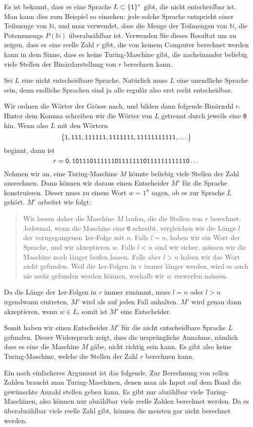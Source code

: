 Es ist bekannt, dass es eine Sprache
$L\subset \{\text{\tt 1}\}^*$ gibt, die nicht entscheidbar ist.
Man kann dies zum Beispiel so einsehen:
jede solche Sprache entspricht einer Teilmenge von $\mathbb N$,
und man verwendet, dass die Menge der Teilmengen von $\mathbb N$,
die Potenzmenge $P(\mathbb N)$ überabzählbar ist.
Verwenden Sie dieses
Resultat um zu zeigen, dass es eine reelle Zahl $r$ gibt, die von keinem
Computer berechnet werden kann in dem Sinne, dass es keine Turing-Maschine
gibt, die nacheinander beliebig viele Stellen der Binärdarstellung von $r$
berechnen
kann.


\begin{loesung}
Sei $L$ eine nicht entscheidbare Sprache. Natürlich muss $L$ eine
unendliche Sprache sein, denn endliche Sprachen sind ja alle regulär
also erst recht entscheidbar.

Wir ordnen die Wörter der Grösse nach, und bilden dann folgende
Binärzahl $r$. Hinter dem Komma schreiben wir die Wörter von $L$
getrennt durch jeweils eine {\tt 0} hin. Wenn also $L$ mit
den Wörtern
\[
\{
\text{\tt 1},
\text{\tt 111},
\text{\tt 111111},
\text{\tt 1111111},
\text{\tt 11111111111},
\dots
\}
\]
beginnt, dann ist
\[
r=\text{\tt 0},\text{\tt 101110111111011111110111111111110}\dots
\]
Nehmen wir an, eine Turing-Maschine $M$ könnte beliebig viele Stellen
der Zahl ausrechnen. Dann können wir daraus einen Entscheider $M'$ für
die Sprache konstruieren. Dieser muss zu einem Wort $w=1^n$ sagen,
ob es zur Sprache $L$ gehört. $M'$ arbeitet wie folgt:

\begin{quote}
Wir lassen daher die Maschine $M$ laufen, die die Stellen von $r$ berechnet.
Jedesmal, wenn die Maschine eine
{\tt 0} schreibt, vergleichen wir die Länge $l$ der vorngegangenen
{\tt 1}er-Folge mit $n$. Falls $l=n$, haben wir ein Wort der Sprache,
und wir akzeptieren $w$. Falls $l<n$ sind wir sicher, müssen wir
die Maschine noch länger laufen lassen. Falls aber $l>n$ haben wir
das Wort nicht gefunden. Weil die {\tt 1}er-Folgen in $r$ immer
länger werden, wird es auch nie mehr gefunden werden können, weshalb
wir $w$ verwerfen müssen.
\end{quote}

Da die Länge der {\tt 1}er-Folgen in $r$ immer zunimmt, muss $l=n$
oder $l>n$ irgendwann eintreten, $M'$ wird als auf jeden Fall
anhalten. $M'$ wird genau dann akzeptieren, wenn $w\in L$, somit
ist $M'$ eine Entscheider.

Somit haben wir einen Entscheider $M'$ für die nicht entscheidbare Sprache
$L$ gefunden. Dieser Widerspruch zeigt, dass die ursprüngliche Annahme,
nämlich dass es eine die Maschine $M$ gäbe, nicht richtig sein kann.
Es gibt also keine Turing-Maschine, welche die Stellen der Zahl $r$ berechnen
kann.

Ein noch einfacheres Argument ist das folgende. Zur Berechnung von
rellen Zahlen braucht man Turing-Maschinen, denen man als Input auf
dem Band die gewünschte Anzahl stellen geben kann. Es gibt nur
abzählbar viele Turing-Maschinen, also können nur abzählbar viele
reelle Zahlen berechnet werden. Da es überabzählbar viele reelle
Zahl gibt, können die meisten gar nicht berechnet werden.
\end{loesung}
